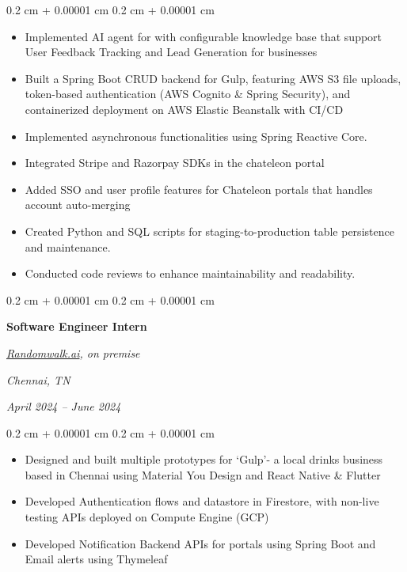 \documentclass[10pt, letterpaper]{article}
\newenvironment{highlights}{
    \begin{itemize}[
        topsep=0.10 cm,
        parsep=0.10 cm,
        partopsep=0pt,
        itemsep=0pt,
        leftmargin=0.4 cm + 10pt
    ]
}{
    \end{itemize}
} %
\newenvironment{onecolentry}{
    \begin{adjustwidth}{
        0.2 cm + 0.00001 cm
    }{
        0.2 cm + 0.00001 cm
    }
}{
    \end{adjustwidth}
} %
\newenvironment{twocolentry}[2][]{
    \onecolentry
    \def\secondColumn{#2}
    \setcolumnwidth{\fill, 4.5 cm}
    \begin{paracol}{2}
}{
    \switchcolumn\raggedleft\secondColumn
    \end{paracol}
    \endonecolentry
} %
\let\hrefWithoutArrow\href
\renewcommand{\href}[2]{\hrefWithoutArrow{#1}{\ifthenelse{\equal{#2}{}}{ }{#2 }\raisebox{.15ex}{\footnotesize \faExternalLink*}}}
\begin{document}
\vspace{0.10 cm}
\begin{onecolentry}
    \begin{highlights}
        \item Implemented AI agent for with configurable knowledge base that support User Feedback Tracking and Lead Generation for businesses
        \item Built a Spring Boot CRUD backend for Gulp, featuring AWS S3 file uploads, token-based authentication (AWS Cognito \& Spring Security), and containerized deployment on AWS Elastic Beanstalk with CI/CD
        \item Implemented asynchronous functionalities using Spring Reactive Core. 
        \item Integrated Stripe and Razorpay SDKs in the chateleon portal
        \item Added SSO and user profile features for Chateleon portals that handles account
        auto-merging
        \item Created Python and SQL scripts for staging-to-production table persistence and maintenance.
        \item Conducted code reviews to enhance maintainability and readability.
    \end{highlights}
\end{onecolentry}

\vspace{0.2 cm}

\begin{twocolentry}{
        \textit{Chennai, TN}

        \textit{April 2024 – June 2024}}
    \textbf{Software Engineer Intern}

    \textit{{\hrefWithoutArrow{https://randomwalk.ai/}{\color{black}\hspace*{0.13cm}Randomwalk.ai}}, on premise}
\end{twocolentry}

\vspace{0.10 cm}
\begin{onecolentry}
    \begin{highlights}
        \item Designed and built multiple prototypes for `Gulp'- a local drinks business
        based in Chennai using Material You Design and React Native \& Flutter
        \item Developed Authentication flows and datastore in Firestore, with non-live
        testing APIs deployed on Compute Engine (GCP)
        \item Developed Notification Backend APIs for
        \textit{\href{https://chateleon.com}{Chateleon}} portals using Spring Boot and
        Email alerts using Thymeleaf
    \end{highlights}
\end{onecolentry}
\end{document}
